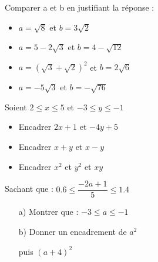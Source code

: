 \documentclass[a4paper,addpoints,12pt]{exam}
\begin{document}
\devoir[prv=false,ds=false,num=2 ,niv=3 , date=01/12/2022,Rdate=12/12/2022 ]

\begin{exo}
\begin{questions}
\question Comparer a et b en justifiant la réponse :

\begin{minipage}{.5\linewidth}
\begin{itemize}
\item $ a=\sqrt{8}$ et $ b=3\sqrt{2}$
\item $a=5-2\sqrt{3} $ et $  b=4-\sqrt{12}$
\end{itemize}
\end{minipage}
\begin{minipage}{.5\linewidth}
\begin{itemize}
\item $ a=(\sqrt{3}+\sqrt{2})^{2}$ et $ b=2\sqrt{6}$
\item $ a=-5\sqrt{3}$ et $ b=-\sqrt{76}$
\end{itemize}
\end{minipage}
\begin{minipage}{.5\textwidth}
\question Soient $2\leq x\leq 5$ et $-3\leq y\leq -1$
\begin{itemize}
\item Encadrer $2x+1$ et $-4y+5$
\item Encadrer $x+y$ et $x-y$
\item Encadrer $x^{2}$ et $y^{2}$ et $xy$
\end{itemize}
\end{minipage}
\begin{minipage}{.5\textwidth}
\question Sachant que : $0.6\leq \dfrac{-2a+1}{5} \leq 1.4$
\begin{itemize}
\item[a)] Montrer que : $-3\leq a \leq -1$
\item[b)] Donner un encadrement de $a^{2}$

 puis $(a+4)^{2}$
\end{itemize}
\end{minipage}
\end{questions}
\end{exo}
\end{document}
